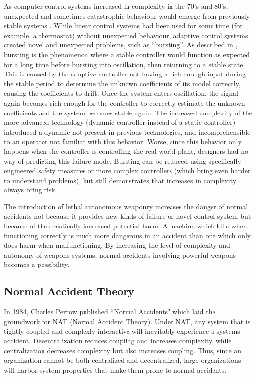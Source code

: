 \documentclass[11pt]{article}
\begin{document}
As computer control systems increased in complexity in the 70's and 80's, unexpected and sometimes
catastrophic behaviour would emerge from previously stable systems \cite{anderson2005control}. While
linear control systems had been used for some time (for example, a thermostat) without unexpected
behaviour, adaptive control systems created novel and unexpected problems, such as ``bursting''. As
described in \cite{anderson2005control}, bursting is the phenomenon where a stable controller would
function as expected for a long time before bursting into oscillation, then returning to a stable
state. This is caused by the adaptive controller not having a rich enough input during the stable
period to determine the unknown coefficients of its model correctly, causing the coefficients to
drift. Once the system enters oscillation, the signal again becomes rich enough for the controller
to correctly estimate the unknown coefficients and the system becomes stable again. The increased
complexity of the more advanced technology (dynamic controller instead of a  static controller)
introduced a dynamic not present in previous technologies, and incomprehensible to an operator not
familiar with this behavior. Worse, since this behavior only happens when the controller is
controlling the real world plant, designers had no way of predicting this failure mode. Bursting can
be reduced using specifically engineered safety measures or more complex controllers (which bring
even harder to understand problems), but still demonstrates that increases in complexity always
bring risk.

The introduction of lethal autonomous weaponry \cite{carvin2017normal} increases the danger of
normal accidents not because it provides new kinds of failure or novel control system but because of
the drastically increased potential harm. A machine which kills when functioning
correctly is much more dangerous in an accident than one which only does harm when malfunctioning.
By increasing the level of complexity and autonomy of weapons systems, normal accidents involving
powerful weapons becomes a possibility.

\subsection{Normal Accident Theory}

In 1984, Charles Perrow published ``Normal Accidents" \cite{perrow1984living} which laid the
groundwork for NAT (Normal Accident Theory). Under NAT, any system that is tightly coupled
and complexly interactive will inevitably experience a systems accident. Decentralization reduces
coupling and increases complexity, while centralization decreases complexity but also increases
coupling. Thus, since an organization cannot be both centralized and decentralized, large
organizations will harbor system properties that make them prone to normal accidents.
\end{document}
